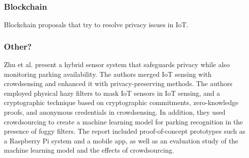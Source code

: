 \documentclass[conference]{IEEEtran}
\begin{document}



\subsubsection{Blockchain}

Blockchain proposals that try to resolve privacy issues in IoT.

\subsubsection{Other?}


Zhu et al. \cite{ZhuIntegrating} present a hybrid sensor system that safeguards
privacy while also monitoring parking availability. The authors merged IoT
sensing with crowdsensing and enhanced it with privacy-preserving methods.
The authors employed physical hazy filters to mask IoT sensors in IoT sensing,
and a cryptographic technique based on cryptographic commitments, zero-knowledge
proofs, and anonymous credentials in crowdsensing. In addition, they used crowdsourcing
to create a machine learning model for parking recognition in the
presence of foggy filters. The report included proof-of-concept prototypes
such as a Raspberry Pi system and a mobile app, as well as an evaluation study
of the machine learning model and the effects of crowdsourcing.
\end{document}
